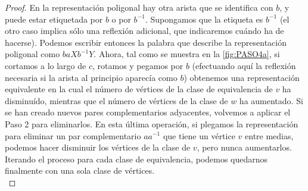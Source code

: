 \documentclass[10pt]{report}
\theoremstyle{definition}
\begin{document}
\begin{proof}
En la representación poligonal hay otra arista que se identifica con $b$, y puede estar etiquetada por $b$ o por $b^{-1}$. Supongamos que la etiqueta es $b^{-1}$ (el otro caso implica sólo una reflexión adicional, que indicaremos cuándo ha de hacerse). Podemos escribir entonces la palabra que describe la representación poligonal como $baXb^{-1}Y$. Ahora, tal como se muestra en la \autoref{fig:PASO4a}, si cortamos a lo largo de $c$, rotamos y pegamos por $b$ (efectuando aquí la reflexión necesaria si la arista al principio aparecía como $b$) obtenemos una representación equivalente en la cual el número de vértices de la clase de equivalencia de $v$ ha disminuído, mientras que el número de vértices de la clase de $w$ ha aumentado. Si se han creado nuevos pares complementarios adyacentes, volvemos a aplicar el Paso 2 para eliminarlos. En esta última operación, si plegamos la representación para eliminar un par complementario $aa^{-1}$ que tiene un vértice $v$ entre medias, podemos hacer disminuir los vértices de la clase de $v$, pero nunca aumentarlos. Iterando el proceso para cada clase de equivalencia, podemos quedarnos finalmente con una sola clase de vértices.\\
 

%


\end{proof}
\end{document}

